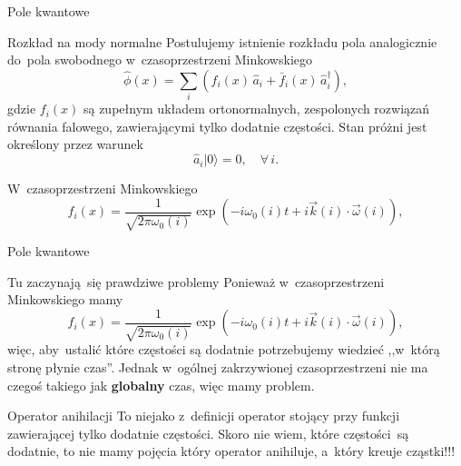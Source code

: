 \documentclass{beamer}  %
\begin{document}
\begin{frame}{Pole kwantowe}

  \begin{block}{Rozkład na mody normalne}
    Postulujemy istnienie rozkładu pola analogicznie do~pola
    swobodnego w~czasoprzestrzeni Minkowskiego
    \begin{equation}
      \label{eq:HawkingPromieniowanie-05}
      \widehat{ \phi }( x )
      = \sum_{ i }( f_{ i }( x )\, \widehat{ a }_{ i }
      + \bar{ f }_{ i }( x )\, \widehat{ a }^{ \dagger }_{ i } ),
    \end{equation}
    gdzie $f_{ i }( x )$ są zupełnym układem ortonormalnych,
    zespolonych rozwiązań równania falowego, zawierającymi tylko
    dodatnie częstości. Stan próżni jest określony przez warunek
    \begin{equation}
      \label{eq:HawkingPromieniowanie-06}
      \widehat{ a }_{ i }| 0 \rangle = 0, \quad \forall\, i.
    \end{equation}
  \end{block}

  \begin{block}{W~czasoprzestrzeni Minkowskiego}
    \begin{equation}
      \label{eq:HawkingPromieniowanie-07}
      f_{ i }( x ) = \frac{ 1 }{ \sqrt{ 2\pi \omega_{ 0 }( i ) } }
      \exp( -i \omega_{ 0 }( i ) t + i \vec{ k }( i )
      \cdot \vec{ \omega }( i ) ),
    \end{equation}
  \end{block}

\end{frame}





\begin{frame}{Pole kwantowe}

  \begin{block}{Tu zaczynają~się prawdziwe problemy}
    Ponieważ w~czasoprzestrzeni Minkowskiego mamy
    \begin{equation}
      \label{eq:HawkingPromieniowanie-08}
      f_{ i }( x ) = \frac{ 1 }{ \sqrt{ 2\pi \omega_{ 0 }( i ) } }
      \exp( -i \omega_{ 0 }( i ) t + i \vec{ k }( i )
      \cdot \vec{ \omega }( i ) ),
    \end{equation}
    więc, aby~ustalić które częstości są dodatnie potrzebujemy
    wiedzieć ,,w~którą stronę płynie czas''. Jednak w~ogólnej
    zakrzywionej czasoprzestrzeni nie ma czegoś takiego jak
    \textbf{globalny} czas, więc mamy problem.
  \end{block}

  \begin{block}{Operator anihilacji}
    To niejako z~definicji operator stojący przy funkcji zawierającej
    tylko dodatnie częstości. Skoro nie wiem, które częstości~są
    dodatnie, to nie mamy pojęcia który operator anihiluje, a~który
    kreuje cząstki!!!
  \end{block}

\end{frame}
\end{document}
